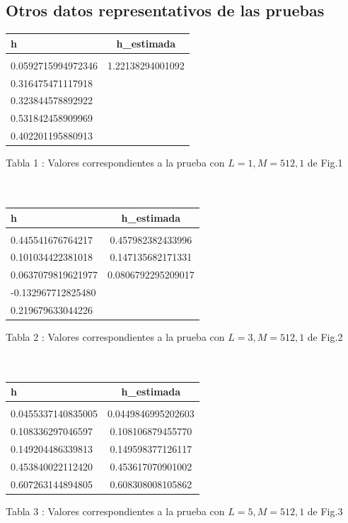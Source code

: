 \documentclass[10pt,journal,compsoc]{IEEEtran}
\begin{document}
\subsection{Otros datos representativos de las pruebas}
 
\begin{tabular}{l c}
\hline\hline
h & h\_estimada\\
\hline \\
0.0592715994972346 & 1.22138294001092\\
0.316475471117918 &\\
0.323844578892922 &\\
0.531842458909969 &\\
0.402201195880913 &\\

\hline\hline

\end{tabular}
 
Tabla 1 : Valores correspondientes a la prueba con $L=1 , M=512, 1$ de Fig.1 \\ \\ \\

\begin{tabular}{l c}
\hline\hline
h &  h\_estimada\\
\hline \\

0.445541676764217 & 0.457982382433996\\
0.101034422381018 & 0.147135682171331\\
0.0637079819621977 & 0.0806792295209017\\
-0.132967712825480 \\
0.219679633044226\\



\hline\hline

\end{tabular}
 
Tabla 2 : Valores correspondientes a la prueba con $L=3 , M=512, 1$ de Fig.2 \\ \\ \\

\begin{tabular}{l c}
\hline\hline
h &  h\_estimada\\
\hline \\

0.0455337140835005 & 0.0449846995202603\\
0.108336297046597 & 0.108106879455770\\
0.149204486339813 & 0.149598377126117\\
0.453840022112420 & 0.453617070901002\\
0.607263144894805 & 0.608308008105862\\




\hline\hline

\end{tabular}
 
Tabla 3 : Valores correspondientes a la prueba con $L=5 , M=512, 1$ de Fig.3
\end{document}
